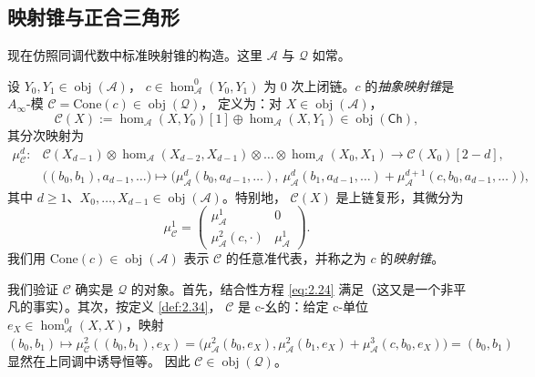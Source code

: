\subsection{映射锥与正合三角形}\label{sec:3.3}

现在仿照同调代数中标准映射锥的构造。这里 $\mathcal A$ 与 $\mathcal Q$ 如常。

\begin{Def}\label{def:3.16}
设 $Y_0,Y_1\in\operatorname{obj}(\mathcal A)$，
$c\in\hom^0_{\mathcal A}(Y_0,Y_1)$ 为 0 次上闭链。$c$ 的\emph{抽象映射锥}是
$A_\infty$-模 $\mathcal C=\mathrm{Cone}(c)\in\operatorname{obj}(\mathcal Q)$，
定义为：对 $X\in\operatorname{obj}(\mathcal A)$，
\[
  \mathcal C(X):=\hom_{\mathcal A}(X,Y_0)[1]\oplus\hom_{\mathcal A}(X,Y_1)
  \in\operatorname{obj}(\mathsf{Ch}),
\]
其分次映射为
\begin{equation}\label{eq:3.35}
  \begin{aligned}
    \mu^d_{\mathcal C}:{}&\mathcal C(X_{d-1})\otimes
    \hom_{\mathcal A}(X_{d-2},X_{d-1})\otimes\dots\otimes
    \hom_{\mathcal A}(X_0,X_1)\longrightarrow\mathcal C(X_0)[2-d],\\
    &\bigl((b_0,b_1),a_{d-1},\dots\bigr)\longmapsto
    \bigl(\mu^d_{\mathcal A}(b_0,a_{d-1},\dots),\ 
    \mu^d_{\mathcal A}(b_1,a_{d-1},\dots)+
    \mu^{d+1}_{\mathcal A}(c,b_0,a_{d-1},\dots)\bigr),
  \end{aligned}
\end{equation}
其中 $d\ge 1$、$X_0,\dots,X_{d-1}\in\operatorname{obj}(\mathcal A)$。特别地，
$\mathcal C(X)$ 是上链复形，其微分为
\[
  \mu^1_{\mathcal C}=
  \begin{pmatrix}
    \mu^1_{\mathcal A} & 0\\
    \mu^2_{\mathcal A}(c,\cdot) & \mu^1_{\mathcal A}
  \end{pmatrix}.
\]
我们用 $\mathrm{Cone}(c)\in\operatorname{obj}(\mathcal A)$ 表示 $\mathcal C$
的任意准代表，并称之为 $c$ 的\emph{映射锥}。
\end{Def}

我们验证 $\mathcal C$ 确实是 $\mathcal Q$ 的对象。首先，结合性方程
\eqref{eq:2.24} 满足（这又是一个非平凡的事实）。其次，按定义 \ref{def:2.34}，
$\mathcal C$ 是 c-幺的：给定 c-单位 $e_X\in\hom^0_{\mathcal A}(X,X)$，映射
$(b_0,b_1)\mapsto\mu^2_{\mathcal C}((b_0,b_1),e_X)=
\bigl(\mu^2_{\mathcal A}(b_0,e_X),\mu^2_{\mathcal A}(b_1,e_X)+
\mu^3_{\mathcal A}(c,b_0,e_X)\bigr)=(b_0,b_1)$ 显然在上同调中诱导恒等。
因此 $\mathcal C\in\operatorname{obj}(\mathcal Q)$。

